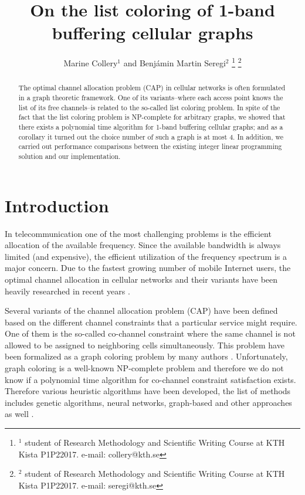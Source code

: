 \documentclass[letterpaper, 10 pt, conference]{ieeeconf}  %
\title{\LARGE \bf
On the list coloring of 1-band buffering cellular graphs
}
\author{Marine Collery$^{1}$ and Benjámin Martin Seregi$^{2}$%
\thanks{$^{1}$ student of Research Methodology and Scientific Writing Course at KTH Kista P1P22017. e-mail: collery@kth.se}%
\thanks{$^{2}$ student of Research Methodology and Scientific Writing Course at KTH Kista P1P22017. e-mail: seregi@kth.se}%
}
\begin{document}
\maketitle
\thispagestyle{fancy}
\fancyhf{}

\begin{abstract}
The optimal channel allocation problem (CAP) in cellular networks is often formulated in a graph theoretic framework. One of its variants\---where each access point knows the list of its free channels\---is related to the so-called list coloring problem. In spite of the fact that the list coloring problem is NP-complete for arbitrary graphs, we showed that there exists a polynomial time algorithm for 1-band buffering cellular graphs; and as a corollary it turned out the choice number of such a graph is at most 4. In addition, we carried out performance comparisons between the existing integer linear programming solution and our implementation.
\end{abstract}

\section{Introduction}

In telecommunication one of the most challenging problems is the efficient allocation of the available frequency. Since the available bandwidth is always limited (and expensive), the efficient utilization of the frequency spectrum is a major concern. Due to the fastest growing number of mobile Internet users, the optimal channel allocation in cellular networks and their variants have been heavily researched in recent years \cite{Audhya:2011:SCA:1988563.1988571}.

Several variants of the channel allocation problem (CAP) have been defined based on the different channel constraints that a particular service might require. One of them is the so-called co-channel constraint where the same channel is not allowed to be assigned to neighboring cells simultaneously. This problem have been formalized as a graph coloring problem by many authors \cite{1456167}. Unfortunately, graph coloring is a well-known NP-complete problem \cite{Kar72} and therefore we do not know if a polynomial time algorithm for co-channel constraint satisfaction exists. Therefore various heuristic algorithms have been developed, the list of methods includes genetic algorithms, neural networks, graph-based and other approaches as well \cite{Audhya:2011:SCA:1988563.1988571}.
\end{document}
